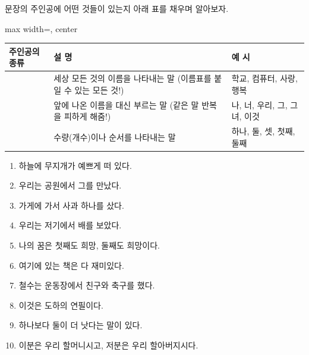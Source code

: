 \documentclass[fs85,seriesRus]{korfarm-base}
\begin{document}
문장의 주인공에 어떤 것들이 있는지 아래 표를 채우며 알아보자. 

\par\medskip{}
\noindent\begin{adjustbox}{max width=\linewidth, center}
\renewcommand{\arraystretch}{1.45}
\begin{tabular}{|>{\raggedright\arraybackslash}p{}|>{\raggedright\arraybackslash}p{}|>{\raggedright\arraybackslash}p{}|}
\hline
\rowcolor{kfPrimaryLight!50}\textbf{\color{kfPrimary} 주인공의 종류} & \textbf{\color{kfPrimary} 설 명} & \textbf{\color{kfPrimary} 예 시} \\\hline
[ ① \_\_\_\_\_\_ ] & 세상 모든 것의 이름을 나타내는 말 (이름표를 붙일 수 있는 모든 것!) & 학교, 컴퓨터, 사랑, 행복 \\\hline
[ ② \_\_\_\_\_\_ ] & 앞에 나온 이름을 대신 부르는 말 (같은 말 반복을 피하게 해줌!) & 나, 너, 우리, 그, 그녀, 이것 \\\hline
[ ③ \_\_\_\_\_\_ ] & 수량(개수)이나 순서를 나타내는 말 & 하나, 둘, 셋, 첫째, 둘째 \\\hline
\end{tabular}
\end{adjustbox}\par\medskip

\kfActivityBg {}
\par{}\par\nopagebreak[4]\smallskip\nopagebreak[4]
\kfBeginMC
\begin{enumerate}[leftmargin=22pt, itemsep=6pt, topsep=4pt, label=\textbf{\arabic*.}]
\item 하늘에 무지개가 예쁘게 떠 있다.
\item 우리는 공원에서 그를 만났다.
\item 가게에 가서 사과 하나를 샀다.
\item 우리는 저기에서 배를 보았다.
\item 나의 꿈은 첫째도 희망, 둘째도 희망이다.
\item 여기에 있는 책은 다 재미있다.
\item 철수는 운동장에서 친구와 축구를 했다.
\item 이것은 도하의 연필이다.
\item 하나보다 둘이 더 낫다는 말이 있다.
\item 이분은 우리 할머니시고, 저분은 우리 할아버지시다.
\end{enumerate}
\kfEndMC
\end{document}
